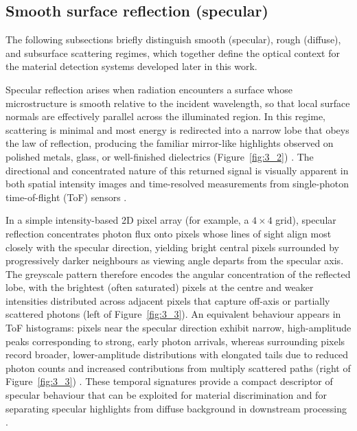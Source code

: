 \documentclass[12pt,a4paper,oneside]{report}
\begin{document}
\subsection{Smooth surface reflection (specular)}
\label{subsec:smooth_specular_reflection}

The following subsections briefly distinguish smooth (specular), rough (diffuse), and subsurface scattering regimes, which together define the optical context for the material detection systems developed later in this work.

Specular reflection arises when radiation encounters a surface whose microstructure is smooth relative to the incident wavelength, so that local surface normals are effectively parallel across the illuminated region. In this regime, scattering is minimal and most energy is redirected into a narrow lobe that obeys the law of reflection, producing the familiar mirror-like highlights observed on polished metals, glass, or well-finished dielectrics (Figure~\ref{fig:3_2}) \cite{elachi2021,schott2007}. The directional and concentrated nature of this returned signal is visually apparent in both spatial intensity images and time-resolved measurements from single-photon time-of-flight (ToF) sensors \cite{su2016}.%

In a simple intensity-based 2D pixel array (for example, a $4\times4$ grid), specular reflection concentrates photon flux onto pixels whose lines of sight align most closely with the specular direction, yielding bright central pixels surrounded by progressively darker neighbours as viewing angle departs from the specular axis. The greyscale pattern therefore encodes the angular concentration of the reflected lobe, with the brightest (often saturated) pixels at the centre and weaker intensities distributed across adjacent pixels that capture off-axis or partially scattered photons (left of Figure~\ref{fig:3_3}). An equivalent behaviour appears in ToF histograms: pixels near the specular direction exhibit narrow, high-amplitude peaks corresponding to strong, early photon arrivals, whereas surrounding pixels record broader, lower-amplitude distributions with elongated tails due to reduced photon counts and increased contributions from multiply scattered paths (right of Figure~\ref{fig:3_3}) \cite{su2016,tafone2023}. These temporal signatures provide a compact descriptor of specular behaviour that can be exploited for material discrimination and for separating specular highlights from diffuse background in downstream processing \cite{su2016,becker2023}.%
\end{document}
